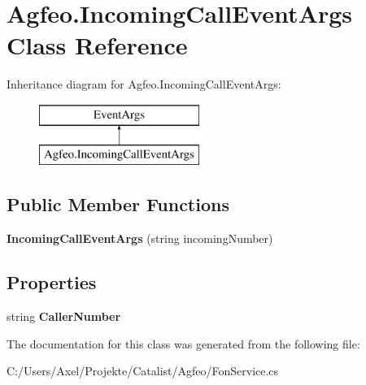 \hypertarget{class_agfeo_1_1_incoming_call_event_args}{}\section{Agfeo.\+Incoming\+Call\+Event\+Args Class Reference}
\label{class_agfeo_1_1_incoming_call_event_args}
Inheritance diagram for Agfeo.\+Incoming\+Call\+Event\+Args\+:\begin{figure}[H]
\begin{center}
\leavevmode
\includegraphics[height=2.000000cm]{class_agfeo_1_1_incoming_call_event_args}
\end{center}
\end{figure}
\subsection*{Public Member Functions}
\begin{DoxyCompactItemize}
\item 
{\bfseries Incoming\+Call\+Event\+Args} (string incoming\+Number)\hypertarget{class_agfeo_1_1_incoming_call_event_args_aaf29281189a2ddd7881a01b9f90f0730}{}\label{class_agfeo_1_1_incoming_call_event_args_aaf29281189a2ddd7881a01b9f90f0730}

\end{DoxyCompactItemize}
\subsection*{Properties}
\begin{DoxyCompactItemize}
\item 
string {\bfseries Caller\+Number}\hypertarget{class_agfeo_1_1_incoming_call_event_args_a4f64cd3e34cde166b0f13a8a14fade6a}{}\label{class_agfeo_1_1_incoming_call_event_args_a4f64cd3e34cde166b0f13a8a14fade6a}

\end{DoxyCompactItemize}


The documentation for this class was generated from the following file\+:\begin{DoxyCompactItemize}
\item 
C\+:/\+Users/\+Axel/\+Projekte/\+Catalist/\+Agfeo/Fon\+Service.\+cs\end{DoxyCompactItemize}
